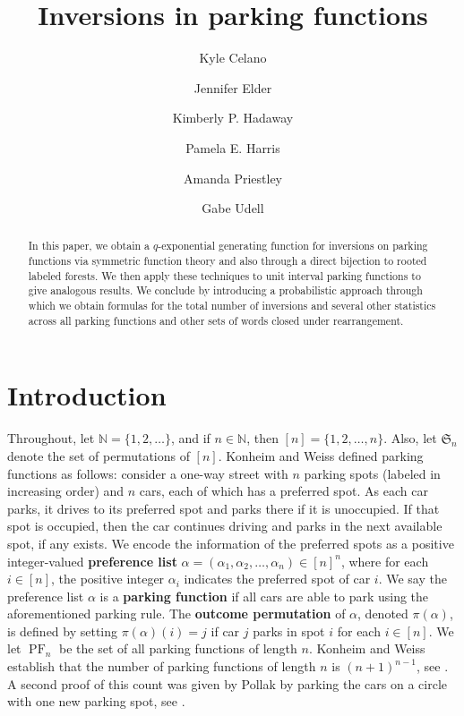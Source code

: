 \documentclass{amsart}
\title{Inversions in parking functions}
\author[Celano]{Kyle Celano}\address[Celano]{Department of Mathematics, Wake Forest University, NC}
\author[Elder]{Jennifer Elder}
\author[Hadaway]{Kimberly P. Hadaway}
\author[Harris]{Pamela E. Harris}
\author[Priestley]{Amanda Priestley}
\author[Udell]{Gabe Udell}
\newcommand{\N}{\mathbb{N}}
\renewcommand{\S}{\mathfrak{S}}
\DeclareMathOperator{\PF}{PF}
\newcommand{\defterm}{\textbf}
\theoremstyle{definition}
\begin{document}
\begin{abstract}
    In this paper, we obtain a $q$-exponential generating function for inversions on parking functions via symmetric function theory and also through a direct bijection to rooted labeled forests. We then apply these techniques to unit interval parking functions to give analogous results. We conclude by introducing a  probabilistic approach through which we obtain formulas for the total number of inversions and several other statistics across all parking functions and other sets of words closed under rearrangement. 
\end{abstract}

\maketitle

\section{Introduction}
Throughout, let $\N=\{1,2,\dots\}$, and if $n\in\N$, then $[n]=\{1,2,\ldots,n\}$. 
Also, let $\S_n$ denote the set of permutations of $[n]$.
Konheim and Weiss \cite{Konheim1966} defined parking functions as follows: consider a one-way street with $n$ parking spots (labeled in increasing order) and $n$ cars, each of which has a preferred spot. 
As each car parks, it drives to its preferred spot and parks there if it is unoccupied. 
If that spot is occupied, then the car continues driving and parks in the next available spot, if any exists.  
We encode the information of the preferred spots as a positive integer-valued \defterm{preference list} $\alpha = (\alpha_1,\alpha_2,\dots,\alpha_n)\in [n]^n$, where for each $i\in[n]$, the positive integer $\alpha_i$ indicates the preferred spot of car $i$. 
We say the preference list $\alpha$ is a \defterm{parking function} if all cars are able to park using the aforementioned parking rule. 
The \defterm{outcome permutation} of $\alpha$, denoted $\pi(\alpha)$, is defined by setting $\pi(\alpha)(i)=j$ if car $j$ parks in spot $i$ for each $i\in [n]$. 
We let $\PF_n$ be the set of all parking functions of length $n$. 
Konheim and Weiss establish
that the number of parking functions of length $n$ is  
$(n+1)^{n-1}$, see \cite[Lemma 1]{Konheim1966}. 
A second proof of this count was given by 
Pollak by parking the cars on a circle with one new parking spot, see \cite{foata1974mappings}.
\end{document}
